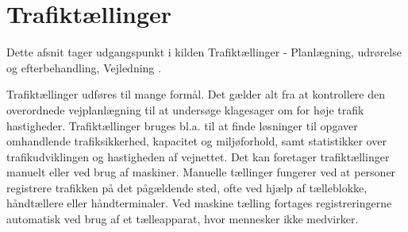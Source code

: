 \section{Trafiktællinger}
\label{sub:trafiktaellinger}
Dette afsnit tager udgangspunkt i kilden Trafiktællinger - Planlægning, udrørelse og efterbehandling, Vejledning \autocite{tallinger}.

Trafiktællinger udføres til mange formål. Det gælder alt fra at kontrollere den overordnede vejplanlægning til at undersøge klagesager om for høje trafik hastigheder. Trafiktællinger bruges bl.a. til at finde løsninger til opgaver omhandlende trafiksikkerhed, kapacitet og miljøforhold, samt statistikker over trafikudviklingen og hastigheden af vejnettet. Det kan foretager trafiktællinger manuelt eller ved brug af maskiner.
Manuelle tællinger fungerer ved at personer registrere trafikken på det pågældende sted, ofte ved hjælp af tælleblokke, håndtællere eller håndterminaler. Ved maskine tælling fortages registreringerne automatisk ved brug af et tælleapparat, hvor mennesker ikke medvirker.

